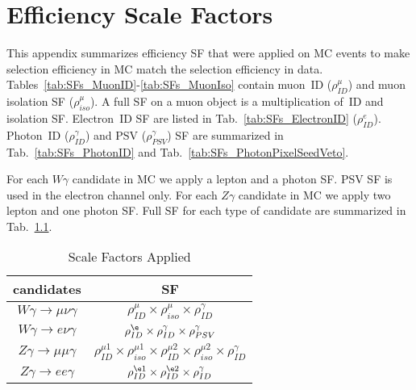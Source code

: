 \chapter{Efficiency Scale Factors}
\label{sec:SFsTables}

This appendix summarizes efficiency SF that were applied on MC events to make selection efficiency in MC match the selection efficiency in data. Tables~\ref{tab:SFs_MuonID}-\ref{tab:SFs_MuonIso} contain muon~ID ($\rho^{\mu}_{ID}$) and muon isolation SF ($\rho^{\mu}_{iso}$). A full SF on a muon object is a multiplication of~ID and isolation SF. Electron~ID SF are listed in Tab.~\ref{tab:SFs_ElectronID} ($\rho^{e}_{ID}$). Photon~ID ($\rho^{\gamma}_{ID}$) and PSV ($\rho^{\gamma}_{PSV}$) SF are summarized in Tab.~\ref{tab:SFs_PhotonID} and Tab.~\ref{tab:SFs_PhotonPixelSeedVeto}.

For each $W\gamma$ candidate in MC we apply a lepton and a photon SF. PSV SF is used in the electron channel only. For each $Z\gamma$ candidate in MC we apply two lepton and one photon SF. Full SF for each type of candidate are summarized in Tab.~\ref{tab:SFs_Applied}.

\begin{table}[h]
  \footnotesize
  \begin{center}
  \caption{Scale Factors Applied} 
   \begin{tabular}{|c|c|}
 candidates                          & SF\\ \hline
 $W\gamma\rightarrow\mu\nu\gamma$   &   $\rho^{\mu}_{ID} \times \rho^{\mu}_{iso} \times \rho^{\gamma}_{ID}$    \\ \hline
 $W\gamma\rightarrow e\nu\gamma$    &   $\rho^{\e}_{ID} \times \rho^{\gamma}_{ID}\times \rho^{\gamma}_{PSV}$       \\ \hline
 $Z\gamma\rightarrow\mu\mu\gamma$   &   $\rho^{\mu1}_{ID} \times \rho^{\mu1}_{iso} \times \rho^{\mu2}_{ID} \times \rho^{\mu2}_{iso} \times \rho^{\gamma}_{ID}$      \\ \hline
 $Z\gamma\rightarrow ee\gamma$      &   $\rho^{\e1}_{ID} \times \rho^{\e2}_{ID} \times \rho^{\gamma}_{ID}$      \\ \hline
  \end{tabular}
  \label{tab:SFs_Applied}
  \end{center}
\end{table}

